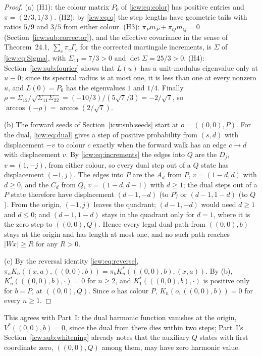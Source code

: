 \documentclass[11pt,letterpaper]{article}
\theoremstyle{remark}\newtheorem{remark}[theorem]{Remark}
\newcommand{\1}{\mathbf1}
\begin{document}
\begin{proof}
(a) (H1): the colour matrix $P_0$ of \eqref{icw:eq:color} has positive entries and $\pi=(2/3,1/3)$. (H2): by \eqref{icw:eq:q} the step lengths have geometric tails with ratios $5/9$ and $3/5$ from either colour. (H3): $\pi_Pm_P+\pi_Qm_Q=0$ (Section~\ref{icw:sub:corrector}), and the effective covariance in the sense of Theorem~24.1, $\sum_c\pi_c\Gamma_c$ for the corrected martingale increments, is $\Sigma$ of \eqref{icw:eq:Sigma}, with $\Sigma_{11}=7/3>0$ and $\det\Sigma=25/3>0$. (H4): Section~\ref{icw:sub:fourier} shows that $L(u)$ has a unit-modulus eigenvalue only at $u\equiv0$; since its spectral radius is at most one, it is less than one at every nonzero $u$, and $L(0)=P_0$ has the eigenvalues $1$ and $1/4$. Finally $\rho=\Sigma_{12}/\sqrt{\Sigma_{11}\Sigma_{22}}=(-10/3)/(5\sqrt7/3)=-2/\sqrt7$, so $\arccos(-\rho)=\arccos(2/\sqrt7)$.

(b) The forward seeds of Section~\ref{icw:sub:seeds} start at $o=((0,0),P)$. For the dual, \eqref{icw:eq:dual} gives a step of positive probability from $(s,d)$ with displacement $-v$ to colour $c$ exactly when the forward walk has an edge $c\to d$ with displacement $v$. By \eqref{icw:eq:increments} the edges into $Q$ are the $D_j$, $v=(1,-j)$, from either colour, so every dual step out of a $Q$ state has displacement $(-1,j)$. The edges into $P$ are the $A_d$ from $P$, $v=(1-d,d)$ with $d\ge0$, and the $C_d$ from $Q$, $v=(1-d,d-1)$ with $d\ge1$; the dual steps out of a $P$ state therefore have displacement $(d-1,-d)$ (to $P$) or $(d-1,1-d)$ (to $Q$). From the origin, $(-1,j)$ leaves the quadrant; $(d-1,-d)$ would need $d\ge1$ and $d\le0$; and $(d-1,1-d)$ stays in the quadrant only for $d=1$, where it is the zero step to $((0,0),Q)$. Hence every legal dual path from $((0,0),b)$ stays at the origin and has length at most one, and no such path reaches $|Wx|\ge R$ for any $R>0$.

(c) By the reversal identity \eqref{icw:eq:reverse}, $\pi_aK_n((x,a),((0,0),b))=\pi_bK^*_n(((0,0),b),(x,a))$. By (b), $K^*_n(((0,0),b),\cdot)=0$ for $n\ge2$, and $K^*_1(((0,0),b),\cdot)$ is positive only for $b=P$, at $((0,0),Q)$. Since $o$ has colour $P$, $K_n(o,((0,0),b))=0$ for every $n\ge1$.
\end{proof}
This agrees with Part~I: the dual harmonic function vanishes at the origin, $V^*((0,0),b)=0$, since the dual from there dies within two steps; Part~I's Section~\ref{icw:sub:whitening} already notes that the auxiliary $Q$ states with first coordinate zero, $((0,0),Q)$ among them, may have zero harmonic value.
\end{document}
